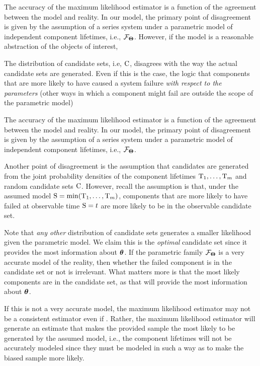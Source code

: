 \documentclass[
    11pt,
    extrafontsizes,
    article,
    oldfontcommands,
    final,
    oneside,
    openany,
    hidelinks]{memoir}
\begin{document}
The accuracy of the maximum likelihood estimator is a function of the agreement between the model and reality.
In our model, the primary point of disagreement is given by the assumption of a series system under a parametric model of independent component lifetimes, i.e., $\mathcal{F}_{\boldsymbol{\Theta}}$.
However, if the model is a reasonable abstraction of the objects of interest, 

The distribution of candidate sets, i.e, $\mathrm{C}$, disagrees with the way the actual candidate sets are generated.
	Even if this is the case, the logic that components that are more likely to have caused a system failure \emph{with respect to the parameters} (other ways in which a component might fail are outside the scope of the parametric model)


The accuracy of the maximum likelihood estimator is a function of the agreement between the model and reality.
In our model, the primary point of disagreement is given by the assumption of a series system under a parametric model of independent component lifetimes, i.e., $\mathcal{F}_{\boldsymbol{\Theta}}$.

Another point of disagreement is the assumption that candidates are generated from the joint probability densities of the component lifetimes $\mathrm{T}_1,\ldots,\mathrm{T}_m$ and random candidate sets $\mathrm{C}$.
However, recall the assumption is that, under the assumed model $\mathrm{S} = \min(\mathrm{T}_1,\ldots,\mathrm{T}_m)$, components that are more likely to have failed at observable time $\mathrm{S} = t$ are more likely to be in the observable candidate set.

Note that \emph{any other} distribution of candidate sets generates a smaller likelihood given the parametric model.
We claim this is the \emph{optimal} candidate set since it provides the most information about $\boldsymbol{\mathbf{\theta}}$.
If the parametric family $\mathcal{F}_{\boldsymbol{\Theta}}$ is a very accurate model of the reality, then whether the failed component is in the candidate set or not is irrelevant.
What matters more is that the most likely components are in the candidate set, as that will provide the most information about $\boldsymbol{\mathbf{\theta}}$.



If this is not a very accurate model, the maximum likelihood estimator may not be a consistent estimator even if .
Rather, the maximum likelihood estimator will generate an estimate that makes the provided sample the most likely to be generated by the assumed model, i.e., the component lifetimes will not be accurately modeled since they must be modeled in such a way as to make the biased sample more likely.
\end{document}
